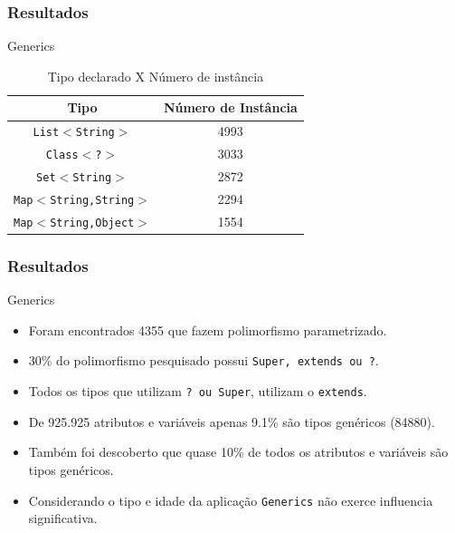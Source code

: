 \documentclass[]{beamer}
\begin{document}
		
	\begin{frame}[fragile, label=re]\frametitle{Resultados}
		\begin{block}{Generics}
			\begin{table}[ht]\footnotesize
				\centering
				\caption{Tipo declarado X Número de instância}
				\begin{tabular}{cc}
					\hline
					Tipo & Número de Instância\\ 
					\hline \hline
					\texttt{List$<$String$>$} & 4993 \\ 
					\texttt{Class$<$?$>$} & 3033 \\ 
					\texttt{Set$<$String$>$} & 2872 \\ 
					\texttt{Map$<$String,String$>$} & 2294 \\ 
					\texttt{Map$ < $String,Object$>$} & 1554 \\ \hline
				\end{tabular}
				\label{tab:tipoXnumeroInstancia} %
			\end{table}
	
			\end{block}
		\end{frame}

	\begin{frame}[fragile, label=re]\frametitle{Resultados}
		\begin{block}{Generics}
			\begin{itemize}
				\item Foram encontrados 4355 que fazem polimorfismo parametrizado.
				
				\item 30\% do polimorfismo pesquisado possui \texttt{Super, extends ou ?}.
				
				\item Todos os tipos que utilizam \texttt{? ou Super}, utilizam o \texttt{extends}.
				
				\item De 925.925 atributos e variáveis apenas 9.1\% são tipos genéricos (84880).
				
				\item Também foi descoberto que quase 10\% de todos os atributos e variáveis são tipos genéricos.
				
				\item Considerando o tipo e idade da aplicação \texttt{Generics} não exerce influencia significativa.
				
			\end{itemize}
		\end{block}
	\end{frame}	
	
\end{document}
